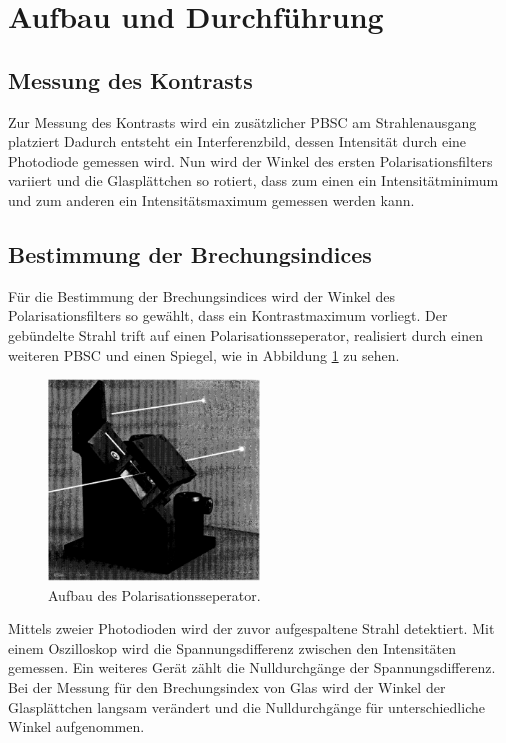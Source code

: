 \newpage
\section{Aufbau und Durchführung}
\label{sec:Durchführung}



\subsection{Messung des Kontrasts}
Zur Messung des Kontrasts wird ein zusätzlicher PBSC am Strahlenausgang platziert
Dadurch entsteht ein Interferenzbild, dessen Intensität durch eine Photodiode gemessen wird.
Nun wird der Winkel des ersten Polarisationsfilters variiert
und die Glasplättchen so rotiert, dass zum einen ein Intensitätminimum und zum anderen
ein Intensitätsmaximum gemessen werden kann.

\subsection{Bestimmung der Brechungsindices}
Für die Bestimmung der Brechungsindices wird der
Winkel des Polarisationsfilters so gewählt, dass ein Kontrastmaximum vorliegt.
Der gebündelte Strahl trift auf einen Polarisationsseperator, realisiert durch einen
weiteren PBSC und einen Spiegel, wie in Abbildung \ref{fig:polsep} zu sehen.
\begin{figure}
     \centering
     \includegraphics[width=0.5\textwidth]{PSBC.PNG}
     \caption{Aufbau des Polarisationsseperator.\cite{skript}}
     \label{fig:polsep}
\end{figure}
\FloatBarrier
Mittels zweier Photodioden wird der zuvor aufgespaltene Strahl detektiert.
Mit einem Oszilloskop wird die Spannungsdifferenz zwischen den Intensitäten
gemessen. Ein weiteres Gerät zählt die Nulldurchgänge der Spannungsdifferenz.
Bei der Messung für den Brechungsindex von Glas wird
der Winkel der Glasplättchen langsam verändert und die Nulldurchgänge für unterschiedliche
Winkel aufgenommen.

